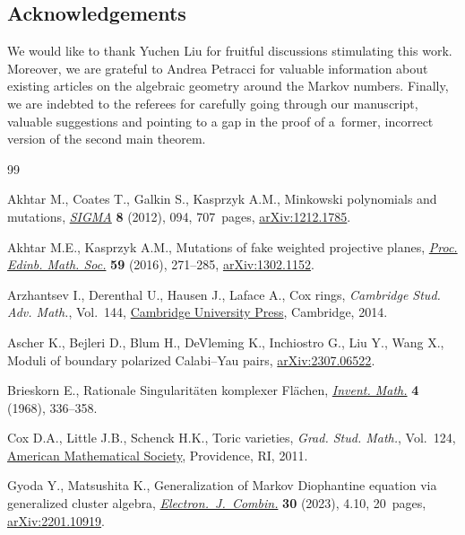\documentclass[10pt,a4paper]{amsart}
\theoremstyle{definition}
\begin{document}
\subsection*{Acknowledgements}

We would like to thank Yuchen Liu for fruitful
discussions stimulating this work.
Moreover, we are grateful to Andrea Petracci for
valuable information about existing articles on
the algebraic geometry around the Markov numbers.
Finally, we are indebted to the referees for
carefully going through our manuscript, valuable
suggestions and pointing to a gap in the proof of
a~former, incorrect version of the second main
theorem.



\begin{thebibliography}{99}
\footnotesize\itemsep=0pt

Akhtar M., Coates T., Galkin S., Kasprzyk A.M., Minkowski polynomials and
 mutations, \href{https://doi.org/10.3842/SIGMA.2012.094}{\textit{SIGMA}}
 \textbf{8} (2012), 094, 707~pages,
 \href{http://arxiv.org/abs/1212.1785}{arXiv:1212.1785}.

Akhtar M.E., Kasprzyk A.M., Mutations of fake weighted projective planes,
 \href{https://doi.org/10.1017/S0013091515000115}{\textit{Proc. Edinb. Math.
 Soc.}} \textbf{59} (2016), 271--285,
 \href{http://arxiv.org/abs/1302.1152}{arXiv:1302.1152}.

Arzhantsev I., Derenthal U., Hausen J., Laface A., Cox rings, \textit{Cambridge
 Stud. Adv. Math.}, Vol.~144,
 \href{https://doi.org/10.1017/CBO9781139175852}{Cambridge University Press}, Cambridge, 2014.

Ascher K., Bejleri D., Blum H., DeVleming K., Inchiostro G., Liu Y., Wang X.,
 Moduli of boundary polarized {C}alabi--{Y}au pairs,
 \href{http://arxiv.org/abs/2307.06522}{arXiv:2307.06522}.

Brieskorn E., Rationale {S}ingularit\"aten komplexer {F}l\"achen,
 \href{https://doi.org/10.1007/BF01425318}{\textit{Invent. Math.}} \textbf{4}
 (1968), 336--358.

Cox D.A., Little J.B., Schenck H.K., Toric varieties, \textit{Grad. Stud.
 Math.}, Vol.~124, \href{https://doi.org/10.1090/gsm/124}{American
 Mathematical Society}, Providence, RI, 2011.

Gyoda Y., Matsushita K., Generalization of {M}arkov {D}iophantine equation via
 generalized cluster algebra,
 \href{https://doi.org/10.37236/11420}{\textit{Electron.~J.~Combin.}}
 \textbf{30} (2023), 4.10, 20~pages,
 \href{http://arxiv.org/abs/2201.10919}{arXiv:2201.10919}.


\end{thebibliography}
\end{document}
